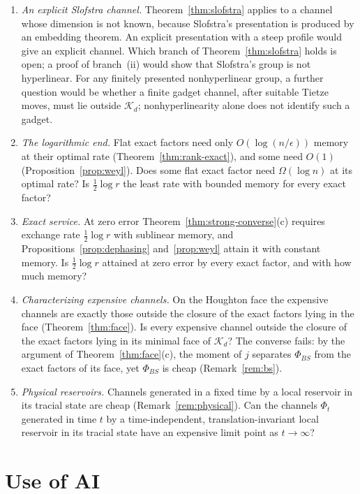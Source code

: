 \documentclass[11pt,a4paper]{article}
\theoremstyle{plain}
\theoremstyle{definition}
\theoremstyle{remark}
\begin{document}
\begin{enumerate}[label=(\arabic*)]
channels on $M_d$, a function $f_d$ with $f_d(\delta)\to0$ as $\delta\to0$ and $\kappa\le f_d(\Delta_J)$? And outside $\mathcal K_d$, how do memory and purity trade?
\item \emph{An explicit Slofstra channel.} Theorem~\ref{thm:slofstra} applies to a channel whose dimension is not known, because Slofstra's presentation is
produced by an embedding theorem. An explicit presentation with a steep profile would give an explicit channel. Which branch of
Theorem~\ref{thm:slofstra} holds is open; a proof of branch~(ii) would show that Slofstra's group is not hyperlinear. For any finitely presented nonhyperlinear group, a further question would be whether a finite gadget channel, after suitable Tietze moves,
must lie outside $\mathcal K_d$; nonhyperlinearity alone does not identify such a gadget.
\item \emph{The logarithmic end.} Flat exact factors need only $O(\log(n/\epsilon))$ memory at their optimal rate (Theorem~\ref{thm:rank-exact}), and some need
$O(1)$ (Proposition~\ref{prop:weyl}). Does some flat exact factor need $\Omega(\log n)$ at its optimal rate? Is $\frac12\log r$ the least rate with bounded memory
for every exact factor?
\item \emph{Exact service.} At zero error Theorem~\ref{thm:strong-converse}(c) requires exchange rate $\frac12\log r$ with sublinear memory, and
Propositions~\ref{prop:dephasing} and~\ref{prop:weyl} attain it with constant memory. Is $\frac12\log r$ attained at zero error by every exact factor, and with
how much memory?
\item \emph{Characterizing expensive channels.} On the Houghton face the expensive channels are exactly those outside the closure of the exact
factors lying in the face (Theorem~\ref{thm:face}). Is every expensive channel outside the closure of the exact factors lying in its minimal face of
$\mathcal K_d$? The converse fails: by the argument of Theorem~\ref{thm:face}(c), the moment of $j$ separates $\Phi_{BS}$ from the exact factors of
its face, yet $\Phi_{BS}$ is cheap (Remark~\ref{rem:bs}).
\item \emph{Physical reservoirs.} Channels generated in a fixed time by a local reservoir in its tracial state are cheap
(Remark~\ref{rem:physical}). Can the channels $\Phi_t$ generated in time $t$ by a time-independent, translation-invariant local reservoir in its
tracial state have an expensive limit point as $t\to\infty$?
\end{enumerate}


\section*{Use of AI}
\end{document}
